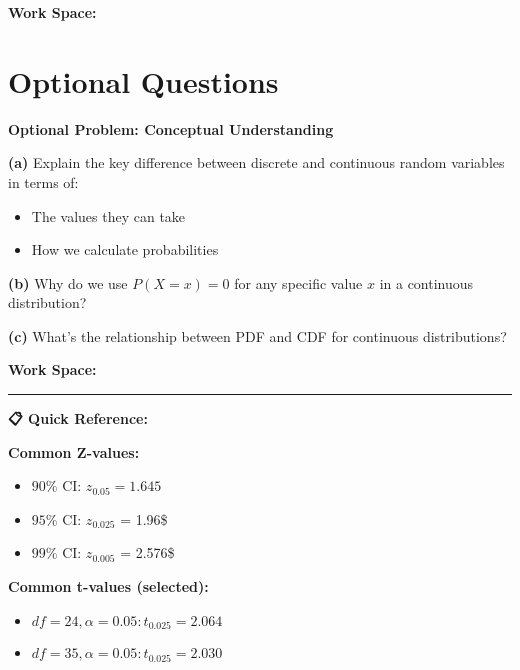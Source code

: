 \documentclass[
  11pt,
]{article}
\begin{document}
\textbf{Work Space:}

\section{Optional Questions}\label{optional-questions}

\textbf{Optional Problem: Conceptual Understanding}

\textbf{(a)} Explain the key difference between discrete and continuous
random variables in terms of:

\begin{itemize}
\item
  The values they can take
\item
  How we calculate probabilities
\end{itemize}

\textbf{(b)} Why do we use \(P(X = x) = 0\) for any specific value \(x\)
in a continuous distribution?

\textbf{(c)} What's the relationship between PDF and CDF for continuous
distributions?

\textbf{Work Space:}

\begin{center}\rule{0.5\linewidth}{0.5pt}\end{center}

\textbf{📋 Quick Reference:}

\textbf{Common Z-values:}

\begin{itemize}
\item
  \(90\%\) CI: \(z_{0.05} = 1.645\)
\item
  \(95\%\) CI: \(z_{0.025}\) = 1.96\$
\item
  \(99\%\) CI: \(z_{0.005}\) = 2.576\$
\end{itemize}

\textbf{Common t-values (selected):}

\begin{itemize}
\item
  \(df = 24, \alpha = 0.05: t_{0.025} = 2.064\)
\item
  \(df = 35, \alpha = 0.05: t_{0.025} = 2.030\)
\end{itemize}
\end{document}
